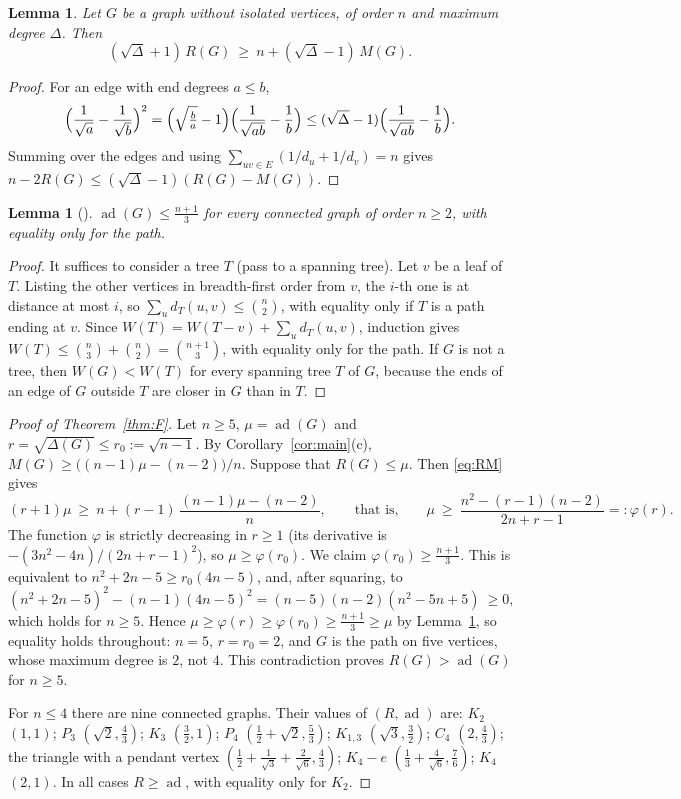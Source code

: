 \documentclass[11pt,a4paper]{article}
\newtheorem{lemma}[theorem]{Lemma}
\theoremstyle{definition}
\theoremstyle{remark}
\numberwithin{equation}{section}
\newcommand{\ad}{\operatorname{ad}}
\begin{document}
\begin{lemma}\label{lem:RM}
Let $G$ be a graph without isolated vertices, of order $n$ and maximum degree
$\Delta$. Then
\begin{equation}\label{eq:RM}
 (\sqrt\Delta+1)\,R(G)\ \ge\ n+(\sqrt\Delta-1)\,M(G).
\end{equation}
\end{lemma}
\begin{proof}
For an edge with end degrees $a\le b$,
\[
 \Bigl(\frac1{\sqrt a}-\frac1{\sqrt b}\Bigr)^2
 =\Bigl(\sqrt{\tfrac ba}-1\Bigr)\Bigl(\frac1{\sqrt{ab}}-\frac1b\Bigr)
 \le(\sqrt\Delta-1)\Bigl(\frac1{\sqrt{ab}}-\frac1b\Bigr).
\]
Summing over the edges and using $\sum_{uv\in E}(1/d_u+1/d_v)=n$ gives
$n-2R(G)\le(\sqrt\Delta-1)(R(G)-M(G))$.
\end{proof}

\begin{lemma}[\cite{EJS}]\label{lem:path}
$\ad(G)\le\frac{n+1}3$ for every connected graph of order $n\ge2$, with equality
only for the path.
\end{lemma}
\begin{proof}
It suffices to consider a tree $T$ (pass to a spanning tree). Let $v$ be a leaf of
$T$. Listing the other vertices in breadth-first order from $v$, the $i$-th one is
at distance at most $i$, so $\sum_ud_T(u,v)\le\binom n2$, with equality only if
$T$ is a path ending at $v$. Since $W(T)=W(T-v)+\sum_ud_T(u,v)$, induction gives
$W(T)\le\binom n3+\binom n2=\binom{n+1}3$, with equality only for the path. If $G$
is not a tree, then $W(G)<W(T)$ for every spanning tree $T$ of $G$, because the ends
of an edge of $G$ outside $T$ are closer in $G$ than in $T$.
\end{proof}

\begin{proof}[Proof of Theorem~\ref{thm:F}]
Let $n\ge5$, $\mu=\ad(G)$ and $r=\sqrt{\Delta(G)}\le r_0:=\sqrt{n-1}$. By
Corollary~\ref{cor:main}(c), $M(G)\ge\bigl((n-1)\mu-(n-2)\bigr)/n$. Suppose that
$R(G)\le\mu$. Then \eqref{eq:RM} gives
\[
 (r+1)\mu\ \ge\ n+(r-1)\,\frac{(n-1)\mu-(n-2)}{n},
 \qquad\text{that is,}\qquad
 \mu\ \ge\ \frac{n^2-(r-1)(n-2)}{2n+r-1}=:\varphi(r).
\]
The function $\varphi$ is strictly decreasing in $r\ge1$ (its derivative is
$-(3n^2-4n)/(2n+r-1)^2$), so $\mu\ge\varphi(r_0)$. We claim
$\varphi(r_0)\ge\frac{n+1}3$. This is equivalent to
$n^2+2n-5\ge r_0(4n-5)$, and, after squaring, to
\[
 (n^2+2n-5)^2-(n-1)(4n-5)^2=(n-5)(n-2)(n^2-5n+5)\ \ge0,
\]
which holds for $n\ge5$. Hence $\mu\ge\varphi(r)\ge\varphi(r_0)\ge\frac{n+1}3\ge\mu$
by Lemma~\ref{lem:path}, so equality holds throughout: $n=5$, $r=r_0=2$, and $G$
is the path on five vertices, whose maximum degree is $2$, not $4$. This
contradiction proves $R(G)>\ad(G)$ for $n\ge5$.

For $n\le4$ there are nine connected graphs. Their values of $(R,\ad)$ are:
$K_2$ $(1,1)$; $P_3$ $(\sqrt2,\frac43)$; $K_3$ $(\frac32,1)$;
$P_4$ $(\frac12+\sqrt2,\frac53)$; $K_{1,3}$ $(\sqrt3,\frac32)$; $C_4$ $(2,\frac43)$;
the triangle with a pendant vertex $(\frac12+\frac1{\sqrt3}+\frac2{\sqrt6},\frac43)$;
$K_4-e$ $(\frac13+\frac4{\sqrt6},\frac76)$; $K_4$ $(2,1)$. In all cases
$R\ge\ad$, with equality only for $K_2$.
\end{proof}
\end{document}
